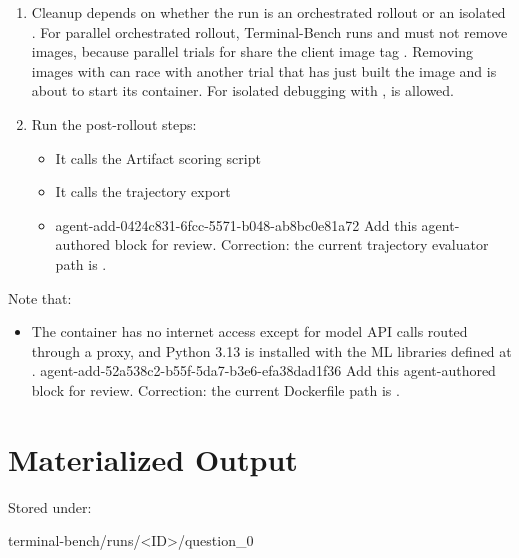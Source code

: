 \documentclass[11pt]{article}
\begin{document}
\begin{enumerate}
\begin{itemize}
  \end{itemize}
  \item Cleanup depends on whether the run is an orchestrated rollout or an isolated .
       For parallel orchestrated rollout, Terminal-Bench runs  and must not remove images, because parallel trials for  share the client image tag .
       Removing images with  can race with another trial that has just built the image and is about to start its container.
       For isolated debugging with ,  is allowed.
  \item Run the post-rollout steps:
  \begin{itemize}
    \item It calls the Artifact scoring script 
    \item It calls the trajectory export 
    \item {}
    \agentProposedEdit
      {agent-add-0424c831-6fcc-5571-b048-ab8bc0e81a72}
      {Add this agent-authored block for review.}
      {}
      {Correction: the current trajectory evaluator path is .}
  \end{itemize}
\end{enumerate}
  
Note that:
\begin{itemize}
\item The container has no internet access except for model API calls routed through a proxy, and Python 3.13 is installed with the ML libraries defined at .
\agentProposedEdit
  {agent-add-52a538c2-b55f-5da7-b3e6-efa38dad1f36}
  {Add this agent-authored block for review.}
  {}
  {Correction: the current Dockerfile path is .}
\end{itemize}

\section*{Materialized Output}
\label{sec:agentic-rollout-materialized-output}
Stored under:
\begin{DocCode}
terminal-bench/runs/<ID>/question_0
\end{DocCode}
\end{document}
